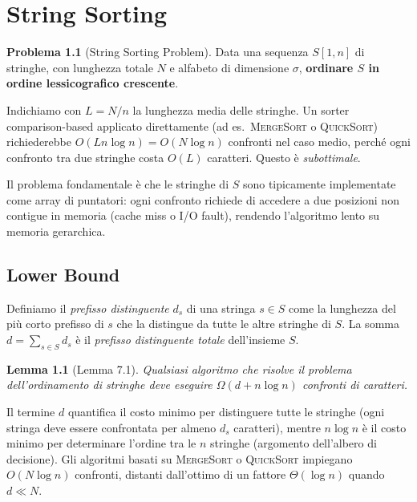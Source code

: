 \documentclass[12pt, a4paper, oneside]{book}
\theoremstyle{plain}
\newtheorem{lemma}[teorema]{Lemma}
\theoremstyle{definition}
\newtheorem{problema}[teorema]{Problema}
\theoremstyle{remark}
\begin{document}
\chapter{String Sorting}

\begin{problema}[String Sorting Problem]
Data una sequenza $S[1,n]$ di stringhe, con lunghezza totale $N$ e alfabeto di dimensione $\sigma$, \textbf{ordinare $S$ in ordine lessicografico crescente}.
\end{problema}

Indichiamo con $L = N/n$ la lunghezza media delle stringhe. Un sorter comparison-based applicato direttamente (ad es.\ \textsc{MergeSort} o \textsc{QuickSort}) richiederebbe $O(Ln\log n) = O(N\log n)$ confronti nel caso medio, perché ogni confronto tra due stringhe costa $O(L)$ caratteri. Questo è \emph{subottimale}.

Il problema fondamentale è che le stringhe di $S$ sono tipicamente implementate come array di puntatori: ogni confronto richiede di accedere a due posizioni non contigue in memoria (cache miss o I/O fault), rendendo l'algoritmo lento su memoria gerarchica.

\section{Lower Bound}

Definiamo il \emph{prefisso distinguente} $d_s$ di una stringa $s \in S$ come la lunghezza del più corto prefisso di $s$ che la distingue da tutte le altre stringhe di $S$. La somma $d = \sum_{s \in S} d_s$ è il \emph{prefisso distinguente totale} dell'insieme $S$.

\begin{lemma}[Lemma 7.1]
Qualsiasi algoritmo che risolve il problema dell'ordinamento di stringhe deve eseguire $\Omega(d + n\log n)$ confronti di caratteri.
\end{lemma}

Il termine $d$ quantifica il costo minimo per distinguere tutte le stringhe (ogni stringa deve essere confrontata per almeno $d_s$ caratteri), mentre $n\log n$ è il costo minimo per determinare l'ordine tra le $n$ stringhe (argomento dell'albero di decisione). Gli algoritmi basati su \textsc{MergeSort} o \textsc{QuickSort} impiegano $O(N\log n)$ confronti, distanti dall'ottimo di un fattore $\Theta(\log n)$ quando $d \ll N$.
\end{document}
